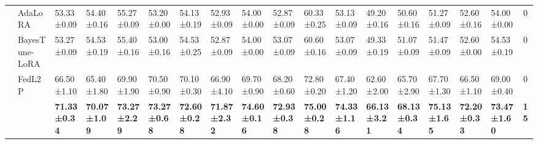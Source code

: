 \begin{table*}[]
\begin{scriptsize}
{\begin{tabular}{c|l|l|l|l|l|l|l|l|l|l|l|l|l|l|l|l|c}
                    & AdaLoRA                              & 53.33±0.09                       & 54.40±0.16                        & 55.27±0.09                       & 53.20±0.00                        & 54.13±0.19                       & 52.93±0.09                       & 54.00±0.00                        & 52.87±0.09                       & 60.33±0.25                       & 53.13±0.09                       & 49.20±0.16                        & 50.60±0.16                        & 51.27±0.09                       & 52.60±0.16                        & 54.00±0.00                        & 0             \\ %
                    & BayesTune-LoRA                            & 53.27±0.09                       & 54.53±0.19                       & 55.40±0.16                        & 53.00±0.16                        & 54.53±0.25                       & 52.87±0.09                       & 54.00±0.00                        & 53.07±0.09                       & 60.60±0.16                        & 53.07±0.09                       & 49.33±0.19                       & 51.07±0.09                       & 51.47±0.09                       & 52.60±0.00                        & 54.53±0.19                       & 0             \\ %
                    & FedL2P                               & 66.50±1.10                        & 65.40±1.80                        & 69.90±1.90                        & 70.50±0.90                        & 70.10±0.30                        & 66.90±4.10                        & 69.70±0.90                        & 68.20±0.60                       & 72.80±0.20                       & 67.40±1.20                       & 62.60±2.00                        & 65.70±2.90                        & 67.70±1.30                        & 66.50±1.10                        & 69.00±0.40                        & 0             \\ %
                    & \method{}                                 & \textbf{71.33±0.34}              & \textbf{70.07±1.09}              & \textbf{73.27±2.29}              & \textbf{73.27±0.68}              & \textbf{72.60±0.28}               & \textbf{71.87±2.32}              & \textbf{74.60±0.16}               & \textbf{72.93±0.38}              & \textbf{75.00±0.28}               & \textbf{74.33±1.16}              & \textbf{66.13±3.21}              & \textbf{68.13±0.34}              & \textbf{75.13±1.65}              & \textbf{72.20±0.33}               & \textbf{73.47±1.60}               & \textbf{15}   \\ \hline

\end{tabular}}
\end{scriptsize}
\end{table*}
